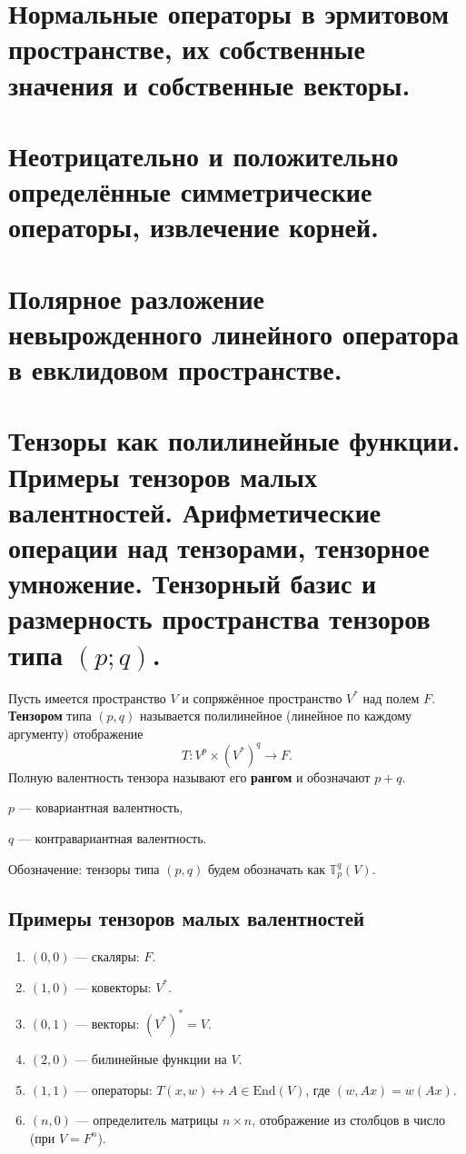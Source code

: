 \documentclass[12pt]{article}
\begin{document}
 \section{Нормальные операторы в эрмитовом пространстве, их собственные значения и собственные векторы.}

 \section{Неотрицательно и положительно определённые симметрические операторы, извлечение корней.}

 \section{Полярное разложение невырожденного линейного оператора в евклидовом пространстве.}

 \section{Тензоры как полилинейные функции. Примеры тензоров малых валентностей. Арифметические операции над тензорами, тензорное умножение. Тензорный базис и размерность пространства тензоров типа $(p; q)$.}

 Пусть имеется пространство $V$ и сопряжённое пространство $V^*$ над полем $F$. \textbf{Тензором} типа $(p, q)$ называется полилинейное (линейное по каждому аргументу) отображение
\[
T: V^p \times (V^*)^q \to F.
\]
Полную валентность тензора называют его \textbf{рангом} и обозначают $p + q$.

$p$ — ковариантная валентность,
    
$q$ — контравариантная валентность.

Обозначение: тензоры типа $(p, q)$ будем обозначать как $\mathbb{T}^q_p(V)$.

\subsection{Примеры тензоров малых валентностей}

\begin{enumerate}
    \item $(0, 0)$ --- скаляры: $F$.
    \item $(1, 0)$ --- ковекторы: $V^*$.
    \item $(0, 1)$ --- векторы: $(V^*)^* = V$.
    \item $(2, 0)$ --- билинейные функции на $V$.
    \item $(1, 1)$ --- операторы: $T(x, w) \leftrightarrow A \in \text{End}(V)$, где $(w, Ax) = w(Ax)$.
    \item $(n, 0)$ --- определитель матрицы $n \times n$, отображение из столбцов в число (при $V = F^n$).
\end{enumerate}
\end{document}
